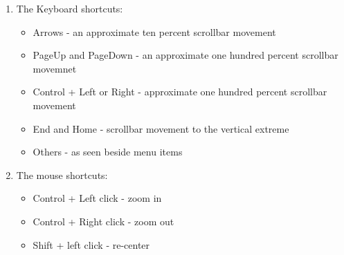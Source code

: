 \begin{enumerate}
\item The Keyboard shortcuts: 

\begin{itemize}
\item Arrows - an approximate ten percent scrollbar movement
\item PageUp and PageDown - an approximate one hundred percent scrollbar movemnet 
\item Control + Left or Right - approximate one hundred percent scrollbar movement 
\item End and Home - scrollbar movement to the vertical extreme 
\item Others - as seen beside menu items
\end{itemize}

\item The mouse shortcuts: 

\begin{itemize}
\item Control + Left click - zoom in 
\item Control + Right click - zoom out
\item Shift + left click - re-center
\end{itemize}
\end{enumerate}
 
%

